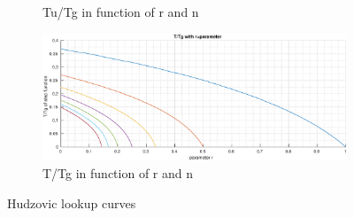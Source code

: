 \begin{figure}
\begin{subfigure}[b]{0.8\textwidth}
         \caption{Tu/Tg in function of r and n}
         \label{fig:hudzovic:curves_tu_tg}
    \end{subfigure}
    \begin{subfigure}[b]{0.8\textwidth}
        \centering
        \includegraphics[width=1\linewidth]{images/hudzovic_curves_t_tg}
        \caption{T/Tg in function of r and n}
        \label{fig:hudzovic:curves_t_tg}
    \end{subfigure}
    \caption{Hudzovic lookup curves}
\end{figure}

